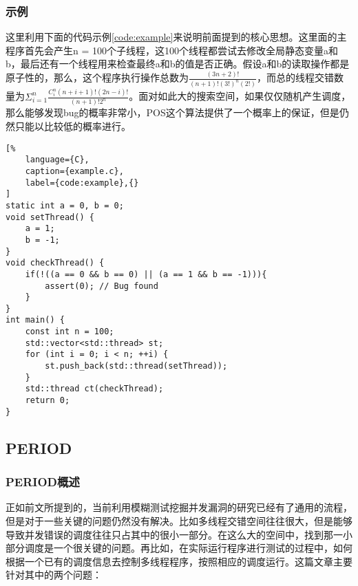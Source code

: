 \subsubsection{示例}

这里利用下面的代码示例\autoref{code:example}来说明前面提到的核心思想。这里面的主程序首先会产生n = 100个子线程，这100个线程都尝试去修改全局静态变量a和b，最后还有一个线程用来检查最终a和b的值是否正确。假设a和b的读取操作都是原子性的，那么，这个程序执行操作总数为$\frac{(3n+2)!}{(n+1)!(3!)^n(2!)}$，而总的线程交错数量为$\Sigma^n_{i=1}\frac{C_i^n(n+i+1)!(2n-i)!}{(n+1)!2^n}$。面对如此大的搜索空间，如果仅仅随机产生调度，那么能够发现bug的概率非常小，POS这个算法提供了一个概率上的保证，但是仍然只能以比较低的概率进行。

\begin{spacing}{1.0}
\begin{lstlisting}[%
    language={C},
    caption={example.c},
    label={code:example},{}
]
static int a = 0, b = 0;
void setThread() {
    a = 1;
    b = -1;
}
void checkThread() {
    if(!((a == 0 && b == 0) || (a == 1 && b == -1))){
        assert(0); // Bug found
    }
}
int main() {
    const int n = 100;
    std::vector<std::thread> st;
    for (int i = 0; i < n; ++i) {
        st.push_back(std::thread(setThread));
    }
    std::thread ct(checkThread);
    return 0;
}
\end{lstlisting}
\end{spacing}

\subsection{PERIOD}

\subsubsection{PERIOD概述}

正如前文所提到的，当前利用模糊测试挖掘并发漏洞的研究已经有了通用的流程，但是对于一些关键的问题仍然没有解决。比如多线程交错空间往往很大，但是能够导致并发错误的调度往往只占其中的很小一部分。在这么大的空间中，找到那一小部分调度是一个很关键的问题。再比如，在实际运行程序进行测试的过程中，如何根据一个已有的调度信息去控制多线程程序，按照相应的调度运行。这篇文章主要针对其中的两个问题：

